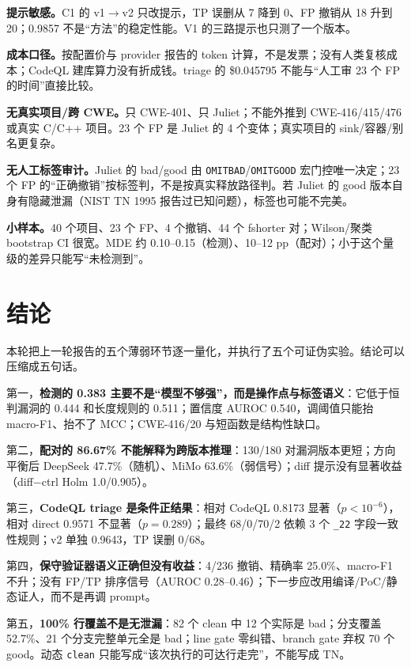 \documentclass[conference]{IEEEtran}
\begin{document}
\textbf{提示敏感。}C1 的 v1$\to$v2 只改提示，TP 误删从 7 降到 0、FP 撤销从 18 升到 20；0.9857 不是“方法”的稳定性能。V1 的三路提示也只测了一个版本。

\textbf{成本口径。}按配置价与 provider 报告的 token 计算，不是发票；没有人类复核成本；CodeQL 建库算力没有折成钱。triage 的 \$0.045795 不能与“人工审 23 个 FP 的时间”直接比较。

\textbf{无真实项目/跨 CWE。}只 CWE-401、只 Juliet；不能外推到 CWE-416/415/476 或真实 C/C++ 项目。23 个 FP 是 Juliet 的 4 个变体；真实项目的 sink/容器/别名更复杂。

\textbf{无人工标签审计。}Juliet 的 bad/good 由 \texttt{OMITBAD}/\texttt{OMITGOOD} 宏门控唯一决定；23 个 FP 的“正确撤销”按标签判，不是按真实释放路径判。若 Juliet 的 good 版本自身有隐藏泄漏（NIST TN 1995 报告过已知问题），标签也可能不完美。

\textbf{小样本。}40 个项目、23 个 FP、4 个撤销、44 个 fshorter 对；Wilson/聚类 bootstrap CI 很宽。MDE 约 0.10--0.15（检测）、10--12 pp（配对）；小于这个量级的差异只能写“未检测到”。

\section{结论}
\label{sec:conclusion}

本轮把上一轮报告的五个薄弱环节逐一量化，并执行了五个可证伪实验。结论可以压缩成五句话。

第一，\textbf{检测的 0.383 主要不是“模型不够强”，而是操作点与标签语义}：它低于恒判漏洞的 0.444 和长度规则的 0.511；置信度 AUROC 0.540，调阈值只能抬 macro-F1、抬不了 MCC；CWE-416/20 与短函数是结构性缺口。

第二，\textbf{配对的 86.67\% 不能解释为跨版本推理}：130/180 对漏洞版本更短；方向平衡后 DeepSeek 47.7\%（随机）、MiMo 63.6\%（弱信号）；diff 提示没有显著收益（diff$-$ctrl Holm 1.0/0.905）。

第三，\textbf{CodeQL triage 是条件正结果}：相对 CodeQL 0.8173 显著（$p<10^{-6}$），相对 direct 0.9571 不显著（$p=0.289$）；最终 68/0/70/2 依赖 3 个 \texttt{\_22} 字段一致性规则；v2 单独 0.9643，TP 误删 0/68。

第四，\textbf{保守验证器语义正确但没有收益}：4/236 撤销、精确率 25.0\%、macro-F1 不升；没有 FP/TP 排序信号（AUROC 0.28--0.46）；下一步应改用编译/PoC/静态证人，而不是再调 prompt。

第五，\textbf{100\% 行覆盖不是无泄漏}：82 个 clean 中 12 个实际是 bad；分支覆盖 52.7\%、21 个分支完整单元全是 bad；line gate 零纠错、branch gate 弃权 70 个 good。动态 \texttt{clean} 只能写成“该次执行的可达行走完”，不能写成 TN。
\end{document}
